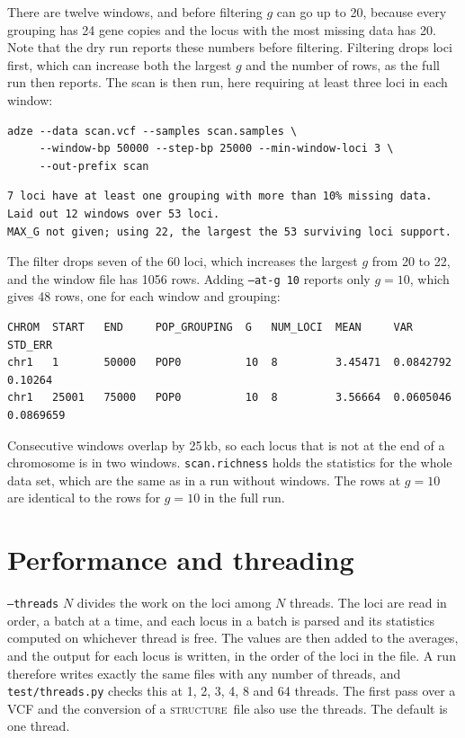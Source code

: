 \documentclass[11pt]{article}
\newcommand{\structureprog}{\textsc{structure}}
\newcommand{\flag}[1]{\texttt{#1}}
\begin{document}
\noindent There are twelve windows, and before filtering $g$ can go up to 20,
because every grouping has 24 gene copies and the locus with the most missing
data has 20. Note that the dry run reports these numbers before filtering.
Filtering drops loci first, which can increase both the largest $g$ and the
number of rows, as the full run then reports. The scan is then run, here
requiring at least three loci in each window:

\begin{Verbatim}[frame=single,fontsize=\small]
adze --data scan.vcf --samples scan.samples \
     --window-bp 50000 --step-bp 25000 --min-window-loci 3 \
     --out-prefix scan
\end{Verbatim}

\begin{Verbatim}[xleftmargin=1em,fontsize=\small]
7 loci have at least one grouping with more than 10% missing data.
Laid out 12 windows over 53 loci.
MAX_G not given; using 22, the largest the 53 surviving loci support.
\end{Verbatim}

\noindent The filter drops seven of the 60 loci, which increases the largest
$g$ from 20 to 22, and the window file has 1056 rows. Adding
\flag{--at-g 10} reports only $g = 10$, which gives 48 rows, one for each
window and grouping:

\begin{Verbatim}[frame=single,fontsize=\small]
CHROM  START   END     POP_GROUPING  G   NUM_LOCI  MEAN     VAR        STD_ERR
chr1   1       50000   POP0          10  8         3.45471  0.0842792  0.10264
chr1   25001   75000   POP0          10  8         3.56664  0.0605046  0.0869659
\end{Verbatim}

\noindent Consecutive windows overlap by 25\,kb, so each locus that is not at
the end of a chromosome is in two windows. \texttt{scan.richness} holds the
statistics for the whole data set, which are the same as in a run without
windows. The rows at $g = 10$ are identical to the rows for $g = 10$ in the
full run.

\section{Performance and threading}

\flag{--threads} $N$ divides the work on the loci among $N$ threads. The loci
are read in order, a batch at a time, and each locus in a batch is parsed and
its statistics computed on whichever thread is free. The values are then added
to the averages, and the output for each locus is written, in the order of the
loci in the file. A run therefore writes exactly the same files with any number
of threads, and \texttt{test/threads.py} checks this at 1, 2, 3, 4, 8 and 64
threads. The first pass over a VCF and the conversion of a \structureprog\ file
also use the threads. The default is one thread.
\end{document}
